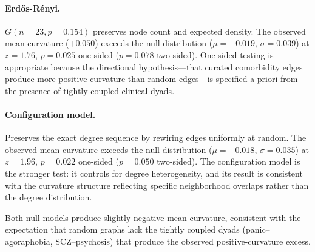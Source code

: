 \documentclass{article}
\begin{document}
\paragraph{Erd\H{o}s-R\'{e}nyi.} $G(n=23, p=0.154)$ preserves node count and expected density. The observed mean curvature ($+0.050$) exceeds the null distribution ($\mu = -0.019$, $\sigma = 0.039$) at $z = 1.76$, $p = 0.025$ one-sided ($p = 0.078$ two-sided). One-sided testing is appropriate because the directional hypothesis---that curated comorbidity edges produce more positive curvature than random edges---is specified a priori from the presence of tightly coupled clinical dyads.

\paragraph{Configuration model.} Preserves the exact degree sequence by rewiring edges uniformly at random. The observed mean curvature exceeds the null distribution ($\mu = -0.018$, $\sigma = 0.035$) at $z = 1.96$, $p = 0.022$ one-sided ($p = 0.050$ two-sided). The configuration model is the stronger test: it controls for degree heterogeneity, and its result is consistent with the curvature structure reflecting specific neighborhood overlaps rather than the degree distribution.

Both null models produce slightly negative mean curvature, consistent with the expectation that random graphs lack the tightly coupled dyads (panic--agoraphobia, SCZ--psychosis) that produce the observed positive-curvature excess.
\end{document}
